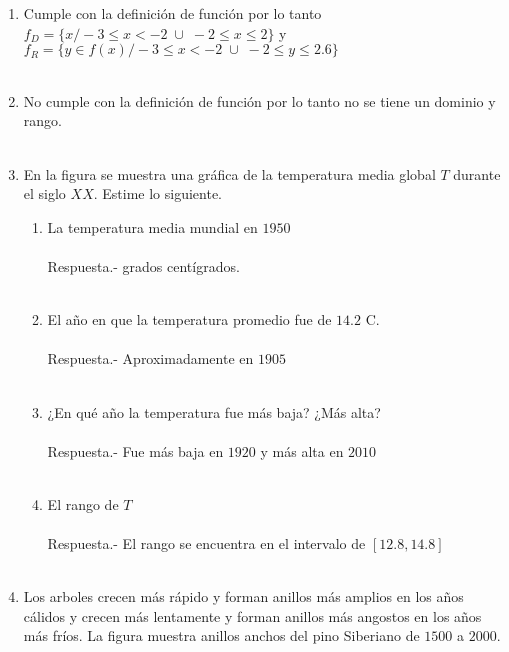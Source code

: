 \begin{enumerate}
    \item Cumple con la definición de función por lo tanto $f_D=\lbrace x / -3 \leq x < -2 \; \cup \; -2 \leq x \leq 2 \rbrace$ y $f_R=\lbrace y \in f(x) / -3 \leq x < -2 \; \cup \; -2 \leq y \leq 2.6 \rbrace$\\\\

    \item No cumple con la definición de función por lo tanto no se tiene un dominio y rango.\\\\

    \item En la figura se muestra una gráfica de la temperatura media global $T$ durante el siglo $XX$. Estime lo siguiente.
	\begin{enumerate}[\bfseries (a)]

	    \item La temperatura media mundial en $1950$\\\\
		Respuesta.- grados centígrados.\\\\

	    \item El año en que la temperatura promedio fue de $14.2$ C.\\\\
		Respuesta.-\; Aproximadamente en $1905$\\\\

	    \item ¿En qué año la temperatura fue más baja? ¿Más alta?\\\\
		Respuesta.-\; Fue más baja en $1920$ y más alta en $2010$\\\\

	    \item El rango de $T$\\\\
		Respuesta.-\; El rango se encuentra en el intervalo de $[12.8,14.8]$\\\\ 

	\end{enumerate}

    \item Los arboles crecen más rápido y forman anillos más amplios en los años cálidos y crecen más lentamente y forman anillos más angostos en los años más fríos. La figura muestra anillos anchos del pino Siberiano de $1500$ a $2000$.


\end{enumerate}
